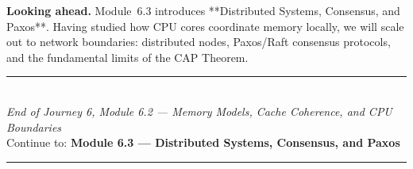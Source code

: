 \documentclass[12pt, a4paper]{book}
\begin{document}
\medskip
\noindent\textbf{Looking ahead.}
Module~6.3 introduces **Distributed Systems, Consensus, and Paxos**. Having studied how CPU cores coordinate memory locally, we will scale out to network boundaries: distributed nodes, Paxos/Raft consensus protocols, and the fundamental limits of the CAP Theorem.

\vspace{1.4cm}
\begin{center}
{\color{JourneyColor}\rule{0.5\linewidth}{0.8pt}}\\[6pt]
{\small\color{JourneyColor}\textit{End of Journey 6, Module 6.2 --- Memory Models, Cache Coherence, and CPU Boundaries}}\\[4pt]
{\small\color{JourneyColor}Continue to: \textbf{Module 6.3 --- Distributed Systems, Consensus, and Paxos}}\\[6pt]
{\color{JourneyColor}\rule{0.5\linewidth}{0.8pt}}
\end{center}
\end{document}

